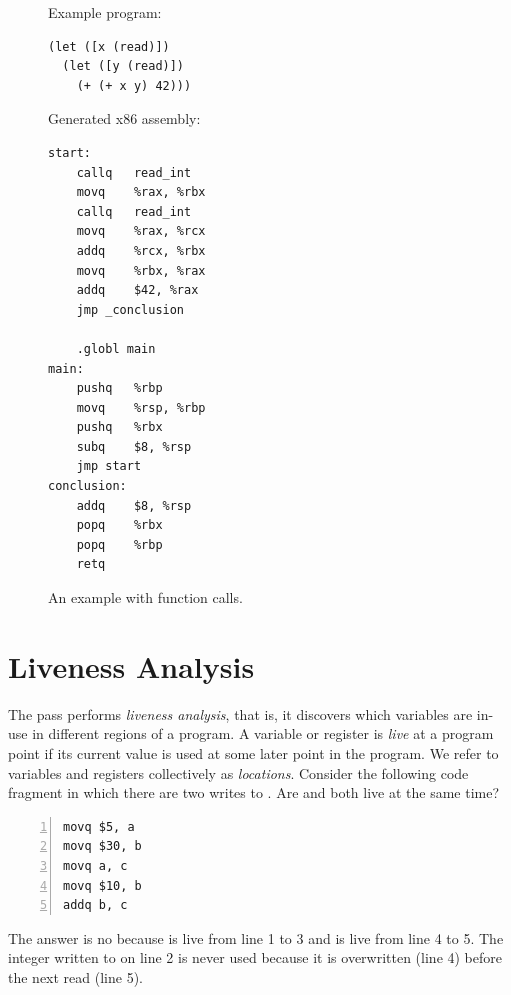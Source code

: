 \documentclass[11pt]{book}
\begin{document}
\begin{figure}[tp]
\begin{minipage}{0.45\textwidth}
Example \LangVar{} program:
\begin{lstlisting}
(let ([x (read)])
  (let ([y (read)])
    (+ (+ x y) 42)))
\end{lstlisting}
\end{minipage}
\begin{minipage}{0.45\textwidth}
Generated x86 assembly:
\begin{lstlisting}
start:
	callq	read_int
	movq	%rax, %rbx
	callq	read_int
	movq	%rax, %rcx
	addq	%rcx, %rbx
	movq	%rbx, %rax
	addq	$42, %rax
	jmp _conclusion

	.globl main
main:
	pushq	%rbp
	movq	%rsp, %rbp
	pushq	%rbx
	subq	$8, %rsp
	jmp start
conclusion:
	addq	$8, %rsp
	popq	%rbx
	popq	%rbp
	retq
\end{lstlisting}
\end{minipage}
\caption{An example with function calls.}
  \label{fig:example-calling-conventions}
\end{figure}

\clearpage

\section{Liveness Analysis}
\label{sec:liveness-analysis-Rvar}


The  pass performs \emph{liveness analysis}, that
is, it discovers which variables are in-use in different regions of a
program.
%
A variable or register is \emph{live} at a program point if its
current value is used at some later point in the program.  We 
refer to variables and registers collectively as \emph{locations}.
%
Consider the following code fragment in which there are two writes to
. Are  and  both live at the same time?
\begin{center}
  \begin{minipage}{0.96\textwidth}
\begin{lstlisting}[numbers=left,numberstyle=\tiny]
movq $5, a
movq $30, b
movq a, c
movq $10, b
addq b, c
\end{lstlisting}
\end{minipage}
\end{center}
The answer is no because  is live from line 1 to 3 and
 is live from line 4 to 5.  The integer written to  on
line 2 is never used because it is overwritten (line 4) before the
next read (line 5).
\end{document}
